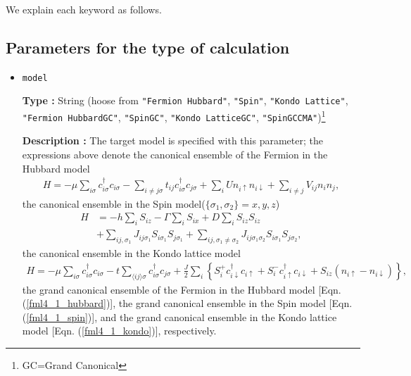 We explain each keyword as follows.

\subsection{Parameters for the type of calculation}

\begin{itemize}

\item \verb|model|

{\bf Type :} String (hoose from \verb|"Fermion Hubbard"|, \verb|"Spin"|, \verb|"Kondo Lattice"|, 
\verb|"Fermion HubbardGC"|, \verb|"SpinGC"|, \verb|"Kondo LatticeGC"|, \verb|"SpinGCCMA"|)\footnote{GC=Grand Canonical}

{\bf Description :} The target model is specified with this parameter;
the expressions above denote the canonical ensemble of the Fermion in the Hubbard model
\begin{align}
H = -\mu \sum_{i \sigma} c^\dagger_{i \sigma} c_{i \sigma} 
- \sum_{i \neq j \sigma} t_{i j} c^\dagger_{i \sigma} c_{j \sigma} 
+ \sum_{i} U n_{i \uparrow} n_{i \downarrow}
+ \sum_{i \neq j} V_{i j} n_{i} n_{j},
\label{fml4_1_hubbard}
\end{align}
the canonical ensemble in the Spin model($\{\sigma_1, \sigma_2\}={x, y, z}$)
\begin{align}
H &= -h \sum_{i} S_{i z} - \Gamma \sum_{i} S_{i x} + D \sum_{i} S_{i z} S_{i z}
\nonumber \\
&+ \sum_{i j, \sigma_1}J_{i j \sigma_1} S_{i \sigma_1} S_{j \sigma_1}+ \sum_{i j, \sigma_1 \neq \sigma_2} J_{i j \sigma_1 \sigma_2} S_{i \sigma_1} S_{j \sigma_2} ,
\label{fml4_1_spin}
\end{align}
the canonical ensemble in the Kondo lattice model
\begin{align}
H = - \mu \sum_{i \sigma} c^\dagger_{i \sigma} c_{i \sigma} 
- t \sum_{\langle i j \rangle \sigma} c^\dagger_{i \sigma} c_{j \sigma} 
+ \frac{J}{2} \sum_{i} \left\{
S_{i}^{+} c_{i \downarrow}^\dagger c_{i \uparrow}
+ S_{i}^{-} c_{i \uparrow}^\dagger c_{i \downarrow}
+ S_{i z} (n_{i \uparrow} - n_{i \downarrow})
\right\},
\label{fml4_1_kondo}
\end{align}
the grand canonical ensemble of the Fermion in the Hubbard model [Eqn. (\ref{fml4_1_hubbard})],
the grand canonical ensemble in the Spin model [Eqn. (\ref{fml4_1_spin})],
and
the grand canonical ensemble in the Kondo lattice model [Eqn. (\ref{fml4_1_kondo})],
respectively.


\end{itemize}

